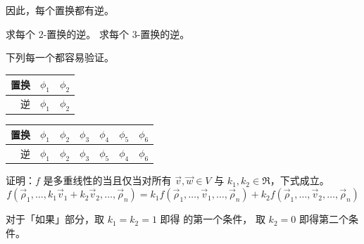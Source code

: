 \begin{exercises}
    因此，每个置换都有逆。
    \begin{exparts}
      \partsitem 求每个 $2$-置换的逆。
      \partsitem 求每个 $3$-置换的逆。
    \end{exparts}
    \begin{answer}
      下列每一个都容易验证。
      \begin{exparts}
        \partsitem
          \begin{tabular}[t]{r|cc}
            置换 &$\phi_1$  &$\phi_2$ \\
             \hline
            逆     &$\phi_1$  &$\phi_2$
          \end{tabular}
        \partsitem
          \begin{tabular}[t]{r|cccccc}
            置换
              &$\phi_1$ &$\phi_2$ &$\phi_3$ &$\phi_4$ &$\phi_5$ &$\phi_6$ \\
            \hline
            逆
              &$\phi_1$ &$\phi_2$ &$\phi_3$ &$\phi_5$ &$\phi_4$ &$\phi_6$
          \end{tabular}
      \end{exparts}
    \end{answer}
  \item
     证明：\( f \) 是多重线性的当且仅当对所有
     \( \vec{v},\vec{w}\in V \) 与 \( k_1,k_2\in\Re \)，下式成立。
      \begin{equation*}
         f(\vec{\rho}_1,\dots,k_1\vec{v}_1+k_2\vec{v}_2,
           \dots,\vec{\rho}_n)
         =
         k_1f(\vec{\rho}_1,\dots,\vec{v}_1,\dots,\vec{\rho}_n)+
         k_2f(\vec{\rho}_1,\dots,\vec{v}_2,\dots,\vec{\rho}_n)
       \end{equation*}
       \begin{answer}
         对于「如果」部分，取 $k_1=k_2=1$ 即得
          的第一个条件，
         取 $k_2=0$ 即得第二个条件。


\end{answer}
\end{exercises}
